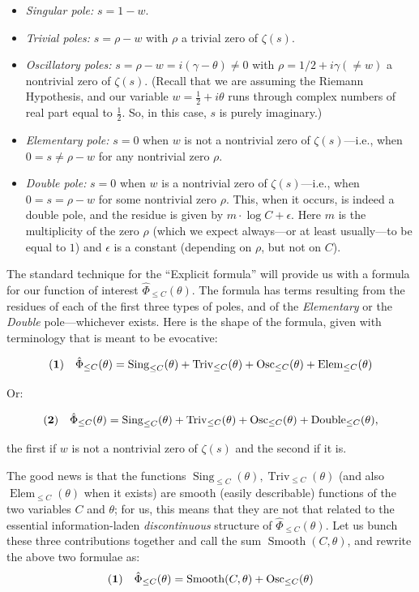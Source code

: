 \documentclass[openany]{book}
\DeclareMathOperator{\Sing}{Sing}
\DeclareMathOperator{\Triv}{Triv}
\DeclareMathOperator{\Osc}{Osc}
\DeclareMathOperator{\Elem}{Elem}
\DeclareMathOperator{\Double}{Double}
\DeclareMathOperator{\Smooth}{Smooth}
\theoremstyle{plain}
\theoremstyle{definition}
\begin{document}
{{ \begin{itemize} \item {\it Singular pole:} $s= 1-w$.
                        \item {\it Trivial poles:}  $s= \rho-w$ with $\rho$ a trivial zero of $\zeta(s)$.
                        \item  {\it Oscillatory poles:} $s= \rho-w = i(\gamma-\theta) \ne 0$ with $\rho= 1/2 + i \gamma (\ne w)$ a nontrivial zero of $\zeta(s)$. (Recall that we are assuming the Riemann Hypothesis, and our variable $w= {\frac{1}{2}}+i\theta$ runs through complex numbers of real part equal to ${\frac{1}{2}}$. So, in this case, $s$ is purely imaginary.)
                        \item {\it Elementary pole:} $s=0$ when  $ w$ is not a nontrivial zero of $\zeta(s)$---i.e., when $0=s\ne\rho-w$ for any nontrivial zero $\rho$.
                        \item {\it Double pole:}  $s=0$ when  $ w$ is a nontrivial zero of $\zeta(s)$---i.e., when $0=s=\rho-w$ for some nontrivial zero $\rho$. This, when it occurs, is indeed a double pole, and the residue is given by $m\cdot \log C +\epsilon$.  Here $m$ is the multiplicity of the zero $\rho$  (which we expect always---or at least usually---to be equal to $1$) and $\epsilon$ is a constant (depending on $\rho$, but not on $C$).

\end{itemize}

           The standard technique for the ``Explicit formula'' will provide us with a formula for our function of interest  ${\hat \Phi}_{\le C}(\theta)$. The formula has terms resulting from the residues of each of the first three types of poles, and of the {\it Elementary} or  the  {\it Double} pole---whichever exists.  Here is the shape of the formula, given with terminology that is meant to be  evocative:


           $$ {\bf(1)}\ \ \ {\hat \Phi}_{\le C}(\theta) = {\Sing}_{\le C}(\theta) + {\Triv}_{\le C}(\theta) +  {\Osc}_{\le C}(\theta) + {\Elem}_{\le C}(\theta)$$

           Or:

           $${\bf(2)}\ \ \ {\hat \Phi}_{\le C}(\theta) = {\Sing}_{\le C}(\theta) + {\Triv}_{\le C}(\theta) +  {\Osc}_{\le C}(\theta) +  {\Double}_{\le C}(\theta),$$

           \noindent the first if $w$ is not a nontrivial zero of $\zeta(s)$ and the second if it is.

                     The good news is that  the functions ${\Sing}_{\le C}(\theta),  {\Triv}_{\le C}(\theta)$ (and also ${\Elem}_{\le C}(\theta)$ when it exists) are smooth (easily describable) functions of the two variables $C$ and $\theta$; for us, this means that they are
not that related to the essential information-laden {\it discontinuous} structure of  $ {\hat \Phi}_{\le C}(\theta)$. Let us bunch these three contributions together and call the sum ${\Smooth}(C,\theta)$, and rewrite the above two formulae as:
                       $$ {\bf(1)}\ \ \ {\hat \Phi}_{\le C}(\theta) ={\Smooth}(C,\theta) +  {\Osc}_{\le C}(\theta) $$

}}
\end{document}
